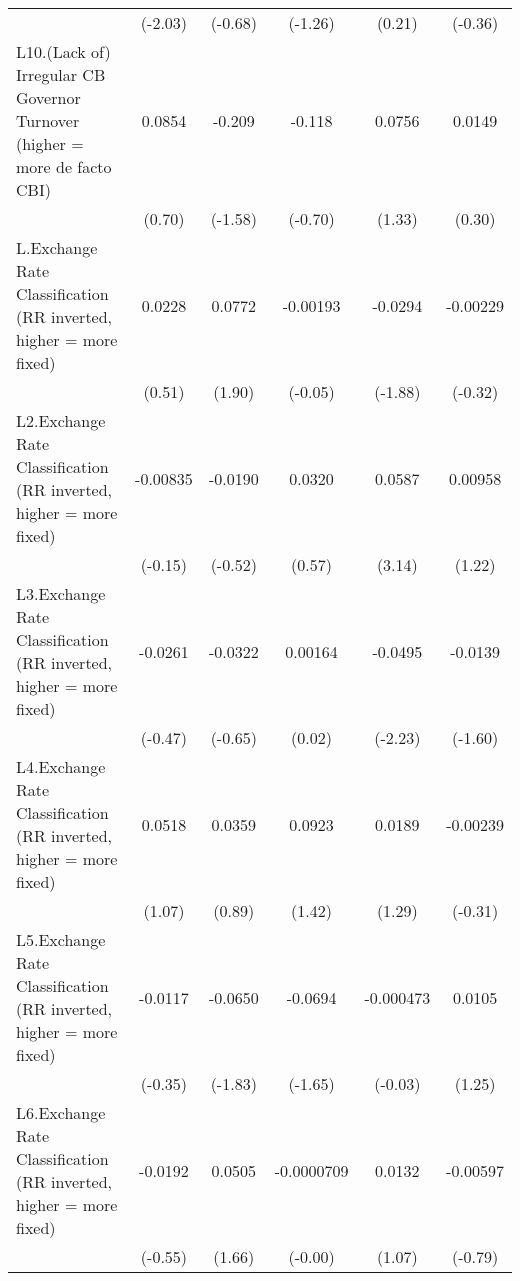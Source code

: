 {\begin{longtable}{l*{5}{c}}
                &  (-2.03)         &  (-0.68)         &  (-1.26)         &   (0.21)         &  (-0.36)         \\
[1em]
L10.(Lack of) Irregular CB Governor Turnover (higher = more de facto CBI)&   0.0854         &   -0.209         &   -0.118         &   0.0756         &   0.0149         \\
                &   (0.70)         &  (-1.58)         &  (-0.70)         &   (1.33)         &   (0.30)         \\
[1em]
L.Exchange Rate Classification (RR inverted, higher = more fixed)&   0.0228         &   0.0772         & -0.00193         &  -0.0294         & -0.00229         \\
                &   (0.51)         &   (1.90)         &  (-0.05)         &  (-1.88)         &  (-0.32)         \\
[1em]
L2.Exchange Rate Classification (RR inverted, higher = more fixed)& -0.00835         &  -0.0190         &   0.0320         &   0.0587\sym{**} &  0.00958         \\
                &  (-0.15)         &  (-0.52)         &   (0.57)         &   (3.14)         &   (1.22)         \\
[1em]
L3.Exchange Rate Classification (RR inverted, higher = more fixed)&  -0.0261         &  -0.0322         &  0.00164         &  -0.0495\sym{*}  &  -0.0139         \\
                &  (-0.47)         &  (-0.65)         &   (0.02)         &  (-2.23)         &  (-1.60)         \\
[1em]
L4.Exchange Rate Classification (RR inverted, higher = more fixed)&   0.0518         &   0.0359         &   0.0923         &   0.0189         & -0.00239         \\
                &   (1.07)         &   (0.89)         &   (1.42)         &   (1.29)         &  (-0.31)         \\
[1em]
L5.Exchange Rate Classification (RR inverted, higher = more fixed)&  -0.0117         &  -0.0650         &  -0.0694         &-0.000473         &   0.0105         \\
                &  (-0.35)         &  (-1.83)         &  (-1.65)         &  (-0.03)         &   (1.25)         \\
[1em]
L6.Exchange Rate Classification (RR inverted, higher = more fixed)&  -0.0192         &   0.0505         &-0.0000709         &   0.0132         & -0.00597         \\
                &  (-0.55)         &   (1.66)         &  (-0.00)         &   (1.07)         &  (-0.79)         \\

\end{longtable}}
